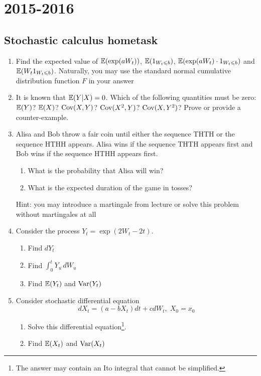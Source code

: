 \documentclass[12pt, a4paper]{article}
\begin{document}
\section{2015-2016}

\subsection{Stochastic calculus hometask}


\begin{enumerate}

\item Find the expected value of $\mathbb{E}(\exp(aW_t))$, $\mathbb{E}(1_{W_t\leqslant b})$, $\mathbb{E}(\exp(aW_t)\cdot 1_{W_t\leqslant b})$ and $\mathbb{E}(W_t 1_{W_t\leqslant b})$. Naturally, you may use the standard normal cumulative distribution function $F$ in your answer


\item It is known that $\mathbb{E}(Y|X)=0$. Which of the following quantities must be zero: $\mathbb{E}(Y)$? $\mathbb{E}(X)$? $\operatorname{Cov}(X,Y)$? $\operatorname{Cov}(X^2,Y)$? $\operatorname{Cov}(X,Y^2)$? Prove or provide a counter-example.

\item Alisa and Bob throw a fair coin until either the sequence THTH or the sequence HTHH appears. Alisa wins if the sequence THTH appears first and Bob wins if the sequence HTHH appears first.
\begin{enumerate}
\item What is the probability that Alisa will win?
\item What is the expected duration of the game in tosses?
\end{enumerate}

Hint: you may introduce a martingale from lecture or solve this problem without martingales at all

\item Consider the process $Y_t=\exp(2W_t-2t)$.

\begin{enumerate}
\item Find $dY_t$
\item Find $\int_0^t Y_u \, dW_u$
\item Find $\mathbb{E}(Y_t)$ and $\operatorname{Var}(Y_t)$
\end{enumerate}

\item Consider stochastic differential equation
\[
dX_t = (a - bX_t) dt + c dW_t, \; X_0=x_0
\]

\begin{enumerate}
\item Solve this differential equation\footnote{The answer may contain an Ito integral that cannot be simplified.}.
\item Find $\mathbb{E}(X_t)$ and $\operatorname{Var}(X_t)$
\end{enumerate}


\end{enumerate}
\end{document}
